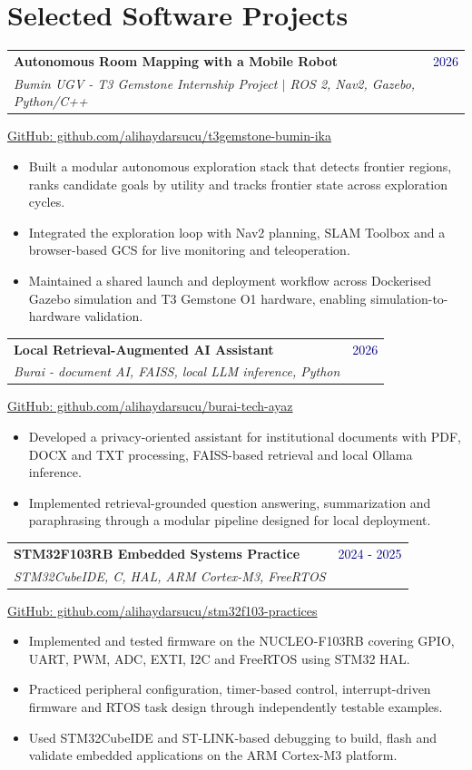 \documentclass[10pt,letterpaper]{article}
\makeatletter
\newcommand{\entry}[4]{%
  \begin{tabularx}{\textwidth}{@{}Xr@{}}
    \textbf{#1} & \textcolor{navy}{#2}\\
    \textit{#3} & \textit{#4}
  \end{tabularx}\vspace{1pt}}
\makeatother
\begin{document}
\section{Selected Software Projects}
\entry{Autonomous Room Mapping with a Mobile Robot}{2026}
      {Bumin UGV - T3 Gemstone Internship Project $\mid$ ROS 2, Nav2, Gazebo, Python/C++}{}
\small\href{https://github.com/alihaydarsucu/t3gemstone-bumin-ika}{GitHub: github.com/alihaydarsucu/t3gemstone-bumin-ika}
\begin{itemize}
  \item Built a modular autonomous exploration stack that detects frontier regions, ranks candidate goals by utility and tracks frontier state across exploration cycles.
  \item Integrated the exploration loop with Nav2 planning, SLAM Toolbox and a browser-based GCS for live monitoring and teleoperation.
  \item Maintained a shared launch and deployment workflow across Dockerised Gazebo simulation and T3 Gemstone O1 hardware, enabling simulation-to-hardware validation.
\end{itemize}
\vspace{2pt}

\entry{Local Retrieval-Augmented AI Assistant}{2026}
      {Burai - document AI, FAISS, local LLM inference, Python}{}
\small\href{https://github.com/alihaydarsucu/burai-tech-ayaz}{GitHub: github.com/alihaydarsucu/burai-tech-ayaz}
\begin{itemize}
  \item Developed a privacy-oriented assistant for institutional documents with PDF, DOCX and TXT processing, FAISS-based retrieval and local Ollama inference.
  \item Implemented retrieval-grounded question answering, summarization and paraphrasing through a modular pipeline designed for local deployment.
\end{itemize}
\vspace{2pt}

\entry{STM32F103RB Embedded Systems Practice}{2024 - 2025}
      {STM32CubeIDE, C, HAL, ARM Cortex-M3, FreeRTOS}{}
\small\href{https://github.com/alihaydarsucu/stm32f103-practices}{GitHub: github.com/alihaydarsucu/stm32f103-practices}
\begin{itemize}
  \item Implemented and tested firmware on the NUCLEO-F103RB covering GPIO, UART, PWM, ADC, EXTI, I2C and FreeRTOS using STM32 HAL.
  \item Practiced peripheral configuration, timer-based control, interrupt-driven firmware and RTOS task design through independently testable examples.
  \item Used STM32CubeIDE and ST-LINK-based debugging to build, flash and validate embedded applications on the ARM Cortex-M3 platform.
\end{itemize}
\vspace{2pt}
\end{document}
